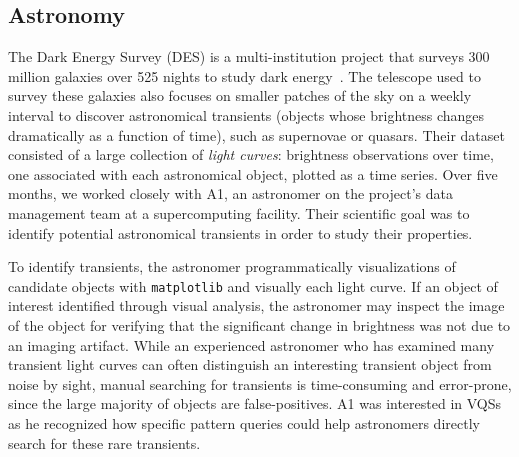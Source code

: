  \subsection{Astronomy}
 \par\noindent{} 
 \npar The Dark Energy Survey (DES) is a multi-institution project that surveys 300 million galaxies over 525 nights to study dark energy~\cite{DrlicaWagner2018}. The telescope used to survey these galaxies also focuses on smaller patches of the sky on a weekly interval to discover astronomical transients (objects whose brightness changes dramatically as a function of time), such as supernovae or quasars. Their dataset consisted of a large collection of \emph{light curves}: brightness observations over time, one associated with each astronomical object, plotted as a time series. Over five months, we worked closely with A1, an astronomer on the project's data management team at a supercomputing facility. Their scientific goal was to identify potential astronomical transients in order to study their properties. 
 \par\noindent{} 
 \npar To identify transients, the astronomer programmatically  visualizations of candidate objects with \texttt{matplotlib} and visually  each light curve. If an object of interest  identified through visual analysis, the astronomer may inspect the image of the object for verifying that the significant change in brightness was not due to an imaging artifact. While an experienced astronomer who has examined many transient light curves can often distinguish an interesting transient object from noise by sight, manual searching for transients is time-consuming and error-prone, since the large majority of objects are false-positives. A1 was interested in VQSs as he recognized how specific pattern queries could help astronomers directly search for these rare transients.
